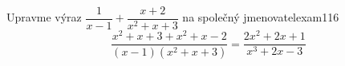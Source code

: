 \begin{mathexam}{Upravme výraz \(\dfrac{1}{x-1}+\dfrac{x+2}{x^2+x+3}\) na společný
  jmenovatel}{exam116}
  \begin{equation*}
    \dfrac{x^2+x+3+x^2+x-2}{(x-1)(x^2+x+3)}= \dfrac{2x^2+2x+1}{x^3+2x-3}
  \end{equation*}  
\end{mathexam}